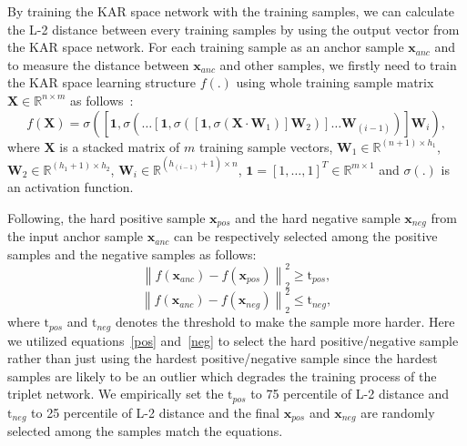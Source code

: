 \documentclass[runningheads]{llncs}
\begin{document}
By training the KAR space network with the training samples, we can calculate the L-2 distance between every training samples by using the output vector from the KAR space network. For each training sample as an anchor sample $\mathbf{x}_{anc}$ and to measure the distance between $\mathbf{x}_{anc}$ and other samples, we firstly need to train the KAR space learning structure $f\left(.\right)$ using whole training sample matrix $\mathbf{X}\in \mathbb{R}^{n\times m}$ as follows~\cite{toh2018gradient}:
\begin{equation}
    f\left(\mathbf{X}\right) = \sigma\left(\left[\mathbf{1},\sigma\left(\dots\left[\mathbf{1},\sigma\left(\left[\mathbf{1},\sigma\left(\mathbf{X}\cdot\mathbf{W}_{1}\right)\right]\mathbf{W}_{2}\right)\right]\dots\mathbf{W}_{(i-1)}\right)\right]\mathbf{W}_{i}\right),
\end{equation}
where $\mathbf{X}$ is a stacked matrix of $m$ training sample vectors, $\mathbf{W}_{1}\in{\mathbb{R}}^{(n+1) \times h_{1}}$, $\mathbf{W}_{2}\in{\mathbb{R}}^{(h_{1}+1) \times h_{2}}$, $\mathbf{W}_{i}\in{\mathbb{R}}^{(h_{(i-1)}+1) \times n}$, $\mathbf{1}=\left[1,\dots,1\right]^{T}\in{\mathbb{R}}^{m \times 1}$ and $\sigma(.)$ is an activation function.

Following, the hard positive sample $\mathbf{x}_{pos}$ and the hard negative sample $\mathbf{x}_{neg}$ from the input anchor sample $\mathbf{x}_{anc}$ can be respectively selected among the positive samples and the negative samples as follows:
\begin{equation}
    {\left\| {{f\left(\mathbf{x}_{anc}\right)} - {f\left(\mathbf{x}_{pos}\right)}} \right\|_2^2} \geq \mathrm{t}_{pos}, \label{pos}
\end{equation}
\begin{equation}
    {\left\| {{f\left(\mathbf{x}_{anc}\right)} - {f\left(\mathbf{x}_{neg}\right)}} \right\|_2^2} \leq \mathrm{t}_{neg},\label{neg}
\end{equation}
where $\mathrm{t}_{pos}$ and $\mathrm{t}_{neg}$ denotes the threshold to make the sample more harder. Here we utilized equations~\eqref{pos} and~\eqref{neg} to select the hard positive/negative sample rather than just using the hardest positive/negative sample since the hardest samples are likely to be an outlier which degrades the training process of the triplet network.
We empirically set the $\mathrm{t}_{pos}$ to 75 percentile of L-2 distance and $\mathrm{t}_{neg}$ to 25 percentile of L-2 distance and the final $\mathbf{x}_{pos}$ and $\mathbf{x}_{neg}$ are randomly selected among the samples match the equations.
\end{document}
